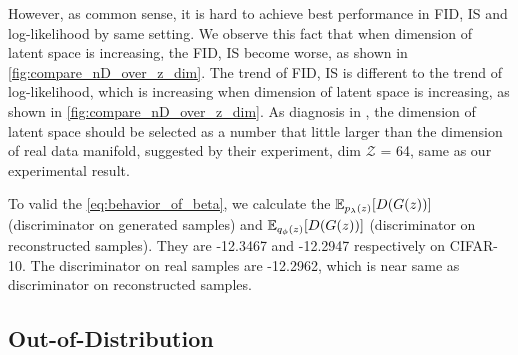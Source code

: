 However, as common sense, it is hard to achieve best performance in FID, IS and log-likelihood by same setting. We observe this fact that when dimension of latent space is increasing, the FID, IS become worse, as shown in \cref{fig:compare_nD_over_z_dim}. The trend of FID, IS is different to the trend of log-likelihood, which is increasing when dimension of latent space is increasing, as shown in \cref{fig:compare_nD_over_z_dim}. As diagnosis in \cite{dai2019diagnosing}, the dimension of latent space should be selected as a number that little larger than the dimension of real data manifold, suggested by their experiment, dim $\mathcal{Z}$ = 64, same as our experimental result.  

To valid the \cref{eq:behavior_of_beta}, we calculate the $\operatorname{\mathbb{E}}_{p_\lambda(z)}[ D(G(z))]$ (discriminator on generated samples) and $\operatorname{\mathbb{E}}_{q_\phi(z)}[ D(G(z))]$ (discriminator on reconstructed samples). They are -12.3467 and -12.2947 respectively on CIFAR-10. The discriminator on real samples are -12.2962, which is near same as discriminator on reconstructed samples. 




\subsection{Out-of-Distribution}


